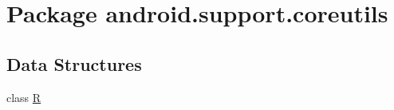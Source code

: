 \hypertarget{namespaceandroid_1_1support_1_1coreutils}{}\section{Package android.\+support.\+coreutils}
\label{namespaceandroid_1_1support_1_1coreutils}
\subsection*{Data Structures}
\begin{DoxyCompactItemize}
\item 
class \mbox{\hyperlink{classandroid_1_1support_1_1coreutils_1_1_r}{R}}
\end{DoxyCompactItemize}
